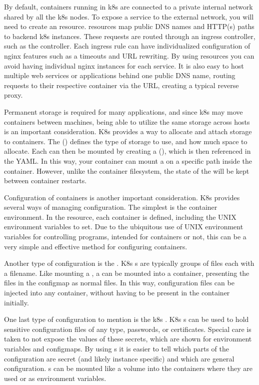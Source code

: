 \documentclass[11pt,twoside]{article}
\begin{document}
By default, containers running in k8s are connected to a private internal network shared by all
the k8s nodes.  To expose a service to the external network, you will need to create an 
resource.   resources map public DNS names and HTTP(s) paths
to backend k8s  instances.  These requests are routed through an ingress
controller, such as the  controller.  Each ingress rule can have
individualized configuration of nginx features such as a timeouts and URL rewriting.
By using  resources you can avoid having individual nginx instances for each service.
It is also easy to host multiple web services or applications behind one public DNS name,
routing requests to their respective container via the URL, creating a typical reverse proxy.

Permanent storage is required for many applications, and since k8s may move containers
between machines, being able to utilize the same storage across hosts is an important
consideration.  K8s provides a way to allocate and attach storage to containers.
The  () defines the type of storage to use, and how
much space to allocate.  Each  can then be mounted by creating a  (), which is then referenced in the  YAML.  In this way, your
container can mount a  on a specific path inside the container.
However, unlike the container filesystem, the state of the  will be kept
between container restarts.

Configuration of containers is another important consideration.  K8s provides several ways of
managing configuration.  The simplest is the container environment.  In the 
resource, each container is defined, including the UNIX environment variables to set.
Due to the ubiquitous use of UNIX environment variables for controlling programs, intended for
containers or not, this can be a very simple and effective method for configuring containers.

Another type of configuration is the .  K8s s are typically
groups of files each with a filename.  Like mounting a , a 
can be mounted into a container, presenting the files in the configmap as normal files.
In this way, configuration files can be injected into any container,
without having to be present in the container initially.

One last type of configuration to mention is the k8s .  K8s s can
be used to hold sensitive configuration files of any type, passwords, or certificates.  Special
care is taken to not expose the values of these secrets, which are shown for
environment variables and configmaps.  By using s it is easier to tell which
parts of the configuration are secret (and likely instance specific) and which are general
configuration.  s can be mounted like a volume into the containers
where they are used or as environment variables.
\end{document}
